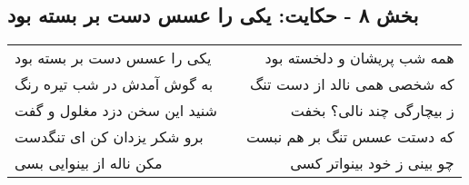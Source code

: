 \begin{center}
\section*{بخش ۸ - حکایت: یکی را عسس دست بر بسته بود}
\label{sec:008}
\begin{longtable}{l p{0.5cm} r}
یکی را عسس دست بر بسته بود
&&
همه شب پریشان و دلخسته بود
\\
به گوش آمدش در شب تیره رنگ
&&
که شخصی همی نالد از دست تنگ
\\
شنید این سخن دزد مغلول و گفت
&&
ز بیچارگی چند نالی؟ بخفت
\\
برو شکر یزدان کن ای تنگدست
&&
که دستت عسس تنگ بر هم نبست
\\
مکن ناله از بینوایی بسی
&&
چو بینی ز خود بینواتر کسی
\\
\end{longtable}
\end{center}
